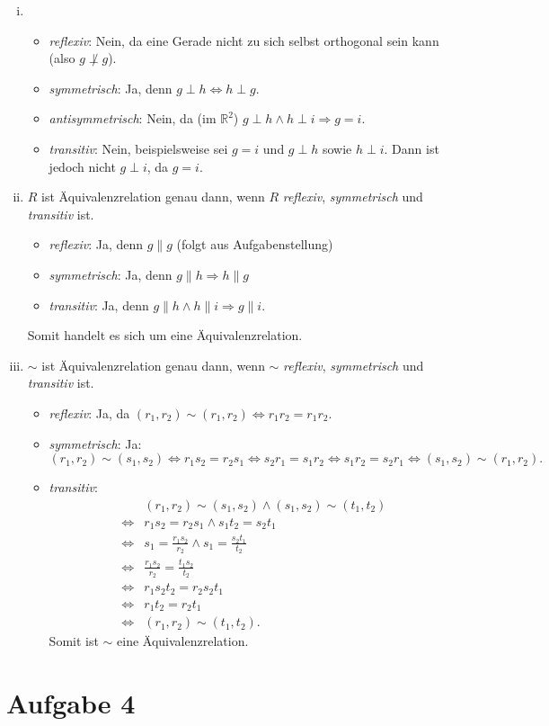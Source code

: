 \documentclass[12pt,a4paper]{article}
\begin{document}
\begin{enumerate}[(i)]
    \item \begin{itemize}
        \item \textit{reflexiv}: Nein, da eine Gerade nicht zu sich selbst orthogonal sein kann (also $g \not\perp g$).
        \item \textit{symmetrisch}: Ja, denn $g \perp h \Leftrightarrow h \perp g$.
        \item \textit{antisymmetrisch}: Nein, da (im $\mathbb{R}^2$) $g \perp h \wedge h \perp i \Rightarrow g = i$.
        \item \textit{transitiv}: Nein, beispielsweise sei $g = i$ und $g \perp h$ sowie $h \perp i$. Dann ist jedoch nicht $g \perp i$, da $g = i$.
    \end{itemize}

    \item $R$ ist Äquivalenzrelation genau dann, wenn $R$ \textit{reflexiv}, \textit{symmetrisch} und \textit{transitiv} ist.
    \begin{itemize}
        \item \textit{reflexiv}: Ja, denn $g \parallel g$ (folgt aus Aufgabenstellung)
        \item \textit{symmetrisch}: Ja, denn $g \parallel h \Rightarrow h \parallel g$
        \item \textit{transitiv}: Ja, denn $g \parallel h \wedge h \parallel i \Rightarrow g \parallel i$.
    \end{itemize}
    Somit handelt es sich um eine Äquivalenzrelation.

    \item $\sim$ ist Äquivalenzrelation genau dann, wenn $\sim$ \textit{reflexiv}, \textit{symmetrisch} und \textit{transitiv} ist.
    \begin{itemize}
        \item \textit{reflexiv}: Ja, da $(r_1, r_2) \sim (r_1, r_2) \Leftrightarrow r_1r_2 = r_1r_2.$
        \item \textit{symmetrisch}: Ja: $(r_1, r_2) \sim (s_1, s_2) \Leftrightarrow r_1s_2 = r_2s_1 \Leftrightarrow s_2r_1 = s_1r_2 \Leftrightarrow s_1r_2 = s_2r_1 \Leftrightarrow (s_1, s_2) \sim (r_1, r_2).$
        \item \textit{transitiv}:
        \begin{align*}
        &(r_1, r_2) \sim (s_1, s_2) \wedge (s_1, s_2) \sim (t_1, t_2)\\
        \Leftrightarrow &r_1s_2 = r_2s_1 \wedge s_1t_2 = s_2t_1\\
        \Leftrightarrow &s_1 = \frac{r_1s_2}{r_2} \wedge s_1 = \frac{s_2t_1}{t_2}\\
        \Leftrightarrow &\frac{r_1s_2}{r_2} = \frac{t_1s_2}{t_2}\\
        \Leftrightarrow &r_1s_2t_2 = r_2s_2t_1\\
        \Leftrightarrow &r_1t_2 = r_2t_1\\
        \Leftrightarrow &(r_1, r_2) \sim (t_1, t_2).
        \end{align*}
        Somit ist $\sim$ eine Äquivalenzrelation.
    \end{itemize}
\end{enumerate}


\section*{Aufgabe 4}


\end{document}
